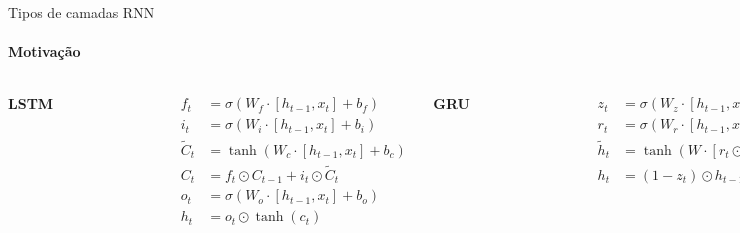 \documentclass{beamer}
\begin{document}
\begin{frame}{Tipos de camadas RNN}
	\framesubtitle{Motivação}
	\begin{columns}[t]
		\begin{center}
			\textbf{LSTM}
		\end{center}

		\begin{figure}[h]
			\centering
			\includegraphics[width=0.33\textwidth]{assets/colah-LSTM-layer.png}
		\end{figure}

		\tiny\[
			\begin{aligned}
				f_t         & = \sigma(W_f \cdot \left[h_{t-1}, x_t \right] + b_f) \\
				i_t         & = \sigma(W_i \cdot \left[h_{t-1}, x_t \right] + b_i) \\
				\tilde{C}_t & = \tanh(W_c \cdot \left[h_{t-1}, x_t \right] + b_c)  \\
				C_t         & = f_t \odot C_{t-1} + i_t \odot \tilde{C}_t          \\
				o_t         & = \sigma(W_o \cdot \left[h_{t-1}, x_t \right] + b_o) \\
				h_t         & = o_t \odot \tanh(c_t)
			\end{aligned}
		\]
		\begin{center}
			\textbf{GRU}
		\end{center}

		\begin{figure}[h]
			\centering
			\includegraphics[width=0.33\textwidth]{assets/colah-GRU-layer.png}
		\end{figure}

		\tiny\[
			\begin{aligned}
				z_t         & = \sigma(W_z \cdot \left[h_{t-1}, x_t \right])        \\
				r_t         & = \sigma(W_r \cdot \left[h_{t-1}, x_t \right])        \\
				\tilde{h}_t & = \tanh(W \cdot \left[r_t \odot h_{t-1}, x_t \right]) \\
				h_t         & = (1 - z_t) \odot h_{t-1} + z_t \odot \tilde{h}_t
			\end{aligned}
		\]

	\end{columns}
\end{frame}
\end{document}
